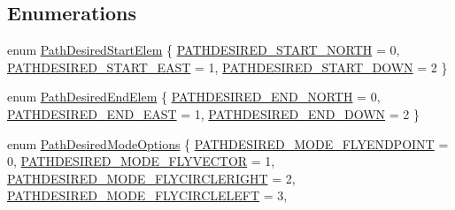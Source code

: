 \subsection*{\-Enumerations}
\begin{DoxyCompactItemize}
\item 
enum \hyperlink{group___path_desired_ga79eb91a0469ead496a14736f19b0e13c}{\-Path\-Desired\-Start\-Elem} \{ \hyperlink{group___path_desired_gga79eb91a0469ead496a14736f19b0e13ca8cfb008680cf5afdd3a2eb205efdbf75}{\-P\-A\-T\-H\-D\-E\-S\-I\-R\-E\-D\-\_\-\-S\-T\-A\-R\-T\-\_\-\-N\-O\-R\-T\-H} = 0, 
\hyperlink{group___path_desired_gga79eb91a0469ead496a14736f19b0e13ca2cf6fd2887a52c8a5bfa13590dbd5a19}{\-P\-A\-T\-H\-D\-E\-S\-I\-R\-E\-D\-\_\-\-S\-T\-A\-R\-T\-\_\-\-E\-A\-S\-T} = 1, 
\hyperlink{group___path_desired_gga79eb91a0469ead496a14736f19b0e13cabb8574f1895bfed59a5470af9c968253}{\-P\-A\-T\-H\-D\-E\-S\-I\-R\-E\-D\-\_\-\-S\-T\-A\-R\-T\-\_\-\-D\-O\-W\-N} = 2
 \}
\item 
enum \hyperlink{group___path_desired_ga0609d99491ed429a75fbac01b867f701}{\-Path\-Desired\-End\-Elem} \{ \hyperlink{group___path_desired_gga0609d99491ed429a75fbac01b867f701aa035016b783f324297d1beb85ce373db}{\-P\-A\-T\-H\-D\-E\-S\-I\-R\-E\-D\-\_\-\-E\-N\-D\-\_\-\-N\-O\-R\-T\-H} = 0, 
\hyperlink{group___path_desired_gga0609d99491ed429a75fbac01b867f701a2bb6672b4be09cf412166a78359390de}{\-P\-A\-T\-H\-D\-E\-S\-I\-R\-E\-D\-\_\-\-E\-N\-D\-\_\-\-E\-A\-S\-T} = 1, 
\hyperlink{group___path_desired_gga0609d99491ed429a75fbac01b867f701a259e32c5e9910e23bd26deb53436c178}{\-P\-A\-T\-H\-D\-E\-S\-I\-R\-E\-D\-\_\-\-E\-N\-D\-\_\-\-D\-O\-W\-N} = 2
 \}
\item 
enum \hyperlink{group___path_desired_ga773ead02009d44ae352a67706d173c3b}{\-Path\-Desired\-Mode\-Options} \{ \*
\hyperlink{group___path_desired_gga773ead02009d44ae352a67706d173c3ba0f2b77ac26cd37bcc83e8520142d8031}{\-P\-A\-T\-H\-D\-E\-S\-I\-R\-E\-D\-\_\-\-M\-O\-D\-E\-\_\-\-F\-L\-Y\-E\-N\-D\-P\-O\-I\-N\-T} = 0, 
\hyperlink{group___path_desired_gga773ead02009d44ae352a67706d173c3ba5995521e4974845a9c51cfb40f07b3d0}{\-P\-A\-T\-H\-D\-E\-S\-I\-R\-E\-D\-\_\-\-M\-O\-D\-E\-\_\-\-F\-L\-Y\-V\-E\-C\-T\-O\-R} = 1, 
\hyperlink{group___path_desired_gga773ead02009d44ae352a67706d173c3ba47f17bb83a59326f03df262a7d72c8ef}{\-P\-A\-T\-H\-D\-E\-S\-I\-R\-E\-D\-\_\-\-M\-O\-D\-E\-\_\-\-F\-L\-Y\-C\-I\-R\-C\-L\-E\-R\-I\-G\-H\-T} = 2, 
\hyperlink{group___path_desired_gga773ead02009d44ae352a67706d173c3ba308be6e337f0aa6940c33272183d6e21}{\-P\-A\-T\-H\-D\-E\-S\-I\-R\-E\-D\-\_\-\-M\-O\-D\-E\-\_\-\-F\-L\-Y\-C\-I\-R\-C\-L\-E\-L\-E\-F\-T} = 3, 

\end{DoxyCompactItemize}
